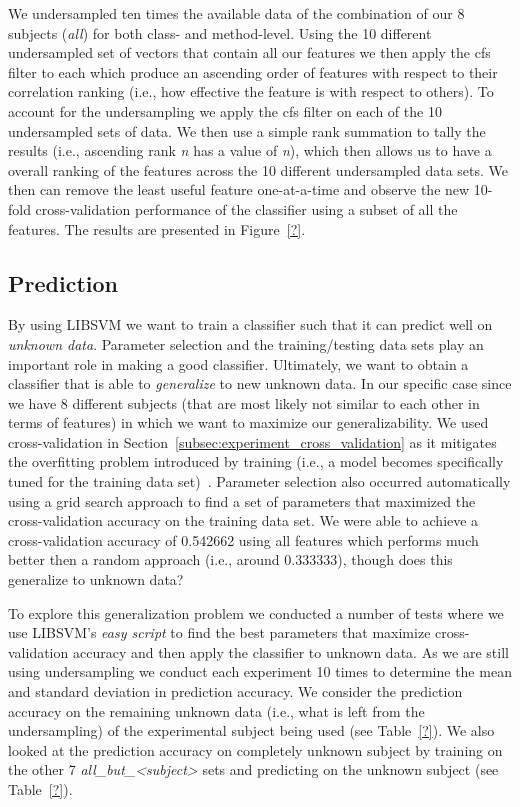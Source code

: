 We undersampled ten times the available data of the combination of our 8 subjects (\emph{all}) for both class- and method-level. Using the 10 different undersampled set of vectors that contain all our features we then apply the \gls{cfs} filter to each which produce an ascending order of features with respect to their correlation ranking (i.e., how effective the feature is with respect to others). To account for the undersampling we apply the \gls{cfs} filter on each of the 10 undersampled sets of data. We then use a simple rank summation to tally the results (i.e., ascending rank \emph{n} has a value of \emph{n}), which then allows us to have a overall ranking of the features across the 10 different undersampled data sets. We then can remove the least useful feature one-at-a-time and observe the new 10-fold cross-validation performance of the classifier using a subset of all the features. The results are presented in Figure~\ref{?}.


\subsection{Prediction}
\label{subsec:experiment_prediction}
By using LIBSVM we want to train a classifier such that it can predict well on \emph{unknown data}. Parameter selection and the training/testing data sets play an important role in making a good classifier. Ultimately, we want to obtain a classifier that is able to \emph{generalize} to new unknown data. In our specific case since we have 8 different subjects (that are most likely not similar to each other in terms of features) in which we want to maximize our generalizability. We used cross-validation in Section~\ref{subsec:experiment_cross_validation} as it mitigates the overfitting problem introduced by training (i.e., a model becomes specifically tuned for the training data set)~\cite{HCL03}. Parameter selection also occurred automatically using a grid search approach to find a set of parameters that maximized the cross-validation accuracy on the training data set. We were able to achieve a cross-validation accuracy of 0.542662 using all features which performs much better then a random approach (i.e., around 0.333333), though does this generalize to unknown data?

To explore this generalization problem we conducted a number of tests where we use LIBSVM's \emph{easy script} to find the best parameters that maximize cross-validation accuracy and then apply the classifier to unknown data. As we are still using undersampling we conduct each experiment 10 times to determine the mean and standard deviation in prediction accuracy. We consider the prediction accuracy on the remaining unknown data (i.e., what is left from the undersampling) of the experimental subject being used (see Table~\ref{?}). We also looked at the prediction accuracy on completely unknown subject by training on the other 7 \emph{all\_but\_<subject>} sets and predicting on the unknown subject (see Table~\ref{?}).


